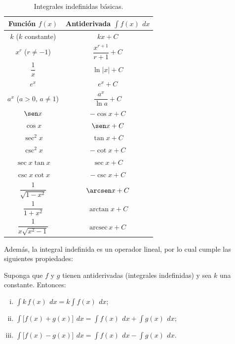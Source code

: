\begin{table}[ht]
\centering
\renewcommand{\arraystretch}{2}
\begin{tabular}{|c|c|}
\hline
\textbf{Función} $f(x)$ & \textbf{Antiderivada} $\displaystyle\int f(x)\,\ dx$ \\
\hline
$k$ \quad ($k$ constante)             & $kx + C$ \\
$x^{r}$ \quad ($r\neq -1$)            & $\dfrac{x^{r+1}}{r+1} + C$ \\
$\dfrac{1}{x}$                        & $\ln|x| + C$ \\
$e^{x}$                               & $e^{x} + C$ \\
$a^{x}$ \quad ($a>0,\,a\neq 1$)       & $\dfrac{a^{x}}{\ln a} + C$ \\
$\sen x$                              & $-\cos x + C$ \\
$\cos x$                              & $\sen x + C$ \\
$\sec^{2}x$                           & $\tan x + C$ \\
$\csc^{2}x$                           & $-\cot x + C$ \\
$\sec x\tan x$                        & $\sec x + C$ \\
$\csc x\cot x$                        & $-\csc x + C$ \\
$\dfrac{1}{\sqrt{1-x^{2}}}$           & $\arcsen x + C$ \\
$\dfrac{1}{1+x^{2}}$                  & $\arctan x + C$ \\
$\dfrac{1}{x\sqrt{x^{2}-1}}$          & $\text{arcsec}\,x + C$ \\
\hline
\end{tabular}
\caption{Integrales indefinidas básicas.}
\label{tab:integrales-basicas}
\end{table}

Además, la integral indefinida es un operador lineal, por lo cual cumple las
siguientes propiedades:

\begin{theorem}
\label{teo:linealidad}
Suponga que $f$ y $g$ tienen antiderivadas (integrales indefinidas) y sea
$k$ una constante. Entonces:
\begin{enumerate}[(i)]
  \item $\displaystyle\int k\,f(x)\,\ dx = k\int f(x)\,\ dx$;
  \item $\displaystyle\int \bigl[f(x)+g(x)\bigr]\,\ dx
         = \int f(x)\,\ dx + \int g(x)\,\ dx$;
  \item $\displaystyle\int \bigl[f(x)-g(x)\bigr]\,\ dx
         = \int f(x)\,\ dx - \int g(x)\,\ dx$.
\end{enumerate}
\end{theorem}

